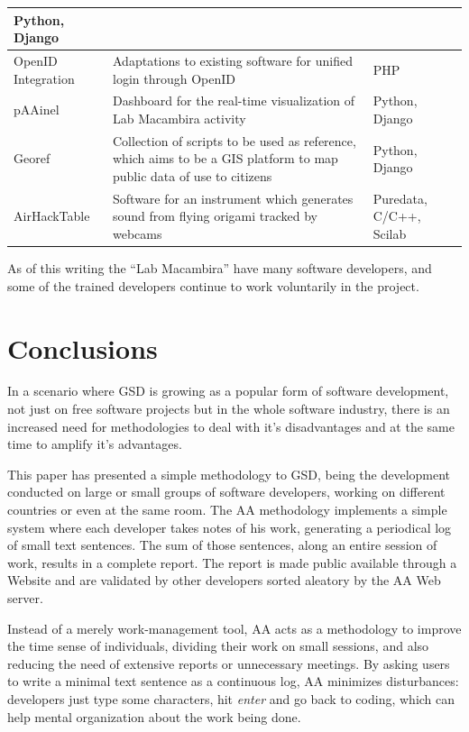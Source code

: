 \documentclass[letterpaper]{article}
\begin{document}
\begin{table}
\begin{tabular}{|l|p{5cm}|l|}
        Python, Django \\
        \hline
        OpenID Integration & Adaptations to existing software for
        unified login through OpenID & PHP \\
        \hline
        pAAinel & Dashboard for the real-time visualization of Lab
        Macambira activity & Python, Django \\
        \hline
        Georef & Collection of scripts to be used as reference, which
        aims to be a GIS platform to map public data of use to
        citizens & Python, Django \\
        \hline
        AirHackTable & Software for an instrument which generates
        sound from flying origami tracked by webcams & Puredata,
        C/C++, Scilab \\
        \hline
        \end{tabular}
    \label{tabela:criados}
\end{table}

As of this writing the ``Lab Macambira'' have many software developers, and some
of the trained developers continue to work voluntarily in the project.

\section{Conclusions}
\label{conclusions}

In a scenario where GSD is growing as a popular form of software development,
not just on free software projects but in the whole software industry, there is an increased need for
methodologies to deal with it's disadvantages and at the same time to amplify it's
advantages.

This paper has presented a simple methodology to GSD, being the development conducted
on large or small groups of software developers, working on different countries
or even at the same room. The AA methodology implements a simple system where
each developer takes notes of his work, generating a periodical log of small text
sentences. The sum of those sentences, along an entire session of work, results
in a complete report. The report is made public available through a Website and
are validated by other developers sorted aleatory by the AA Web server.

Instead of a merely work-management tool, AA acts as a methodology to improve the
time sense of individuals, dividing their work on small sessions, and also
reducing the need of extensive reports or unnecessary meetings. By asking users
to write a minimal text sentence as a continuous log, AA minimizes
disturbances: developers just type some
characters, hit \textit{enter} and go back to coding, which can help mental organization about the work being done.
\end{document}
